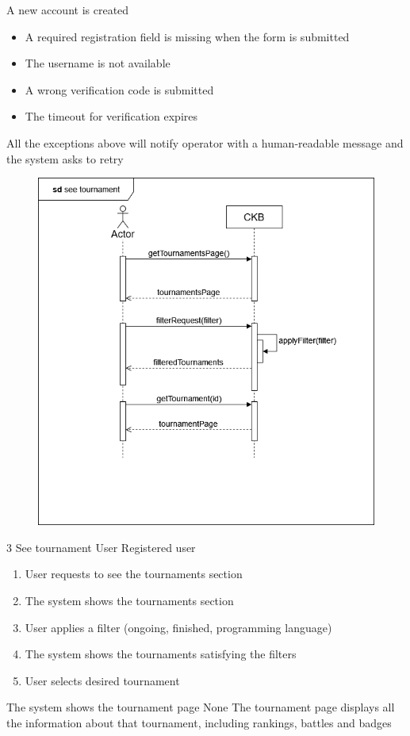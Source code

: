 {A new account is created} %
{ %
    \begin{itemize}
        \item A required registration field is missing when the form is submitted
        \item The username is not available
        \item A wrong verification code is submitted
        \item The timeout for verification expires
    \end{itemize}
}
{ %
    All the exceptions above will notify operator with a human-readable message and the system asks to retry
}

\usecase
{
    \begin{figure}[H]
        \centering
        \includegraphics[width=\textwidth]{src/sd_diagrams/tournaments.png}
    \end{figure}
}
{3}
{See tournament} %
{User} %
{Registered user} %
{ %
    \begin{enumerate}
        \item User requests to see the tournaments section
        \item The system shows the tournaments section
        \item User applies a filter (ongoing, finished, programming language)    
        \item The system shows the tournaments satisfying the filters
        \item User selects desired tournament
    \end{enumerate}
}
{The system shows the tournament page} %
{ %
    None
}
{ %
The tournament page displays all the information about that tournament, including rankings, battles and badges
}

